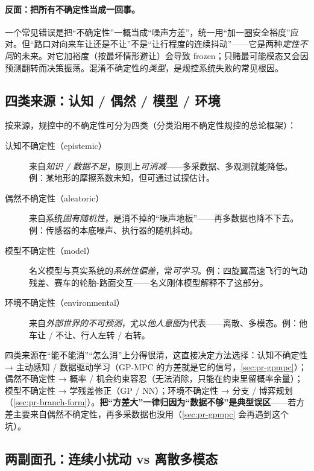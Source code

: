 \paragraph{反面：把所有不确定性当成一回事。}
一个常见错误是把“不确定性”一概当成“噪声方差”，统一用“加一圈安全裕度”应对。但“路口对向来车让还是不让”不是“让行程度的连续抖动”——它是两种\emph{定性不同}的未来。对它加裕度（按最坏情形避让）会导致 frozen；只赌最可能模态又会因预测翻转而决策振荡。混淆不确定性的\emph{类型}，是规控系统失败的常见根因。

\subsection{四类来源：认知 / 偶然 / 模型 / 环境}
\label{sec:pr-unc-types}

按来源，规控中的不确定性可分为四类（分类沿用不确定性规控的总论框架）：

\begin{description}
  \item[认知不确定性（epistemic）] 来自\emph{知识 / 数据不足}，原则上\emph{可消减}——多采数据、多观测就能降低。例：某地形的摩擦系数未知，但可通过试探估计。
  \item[偶然不确定性（aleatoric）] 来自系统\emph{固有随机性}，是消不掉的“噪声地板”——再多数据也降不下去。例：传感器的本底噪声、执行器的随机抖动。
  \item[模型不确定性（model）] 名义模型与真实系统的\emph{系统性偏差}，常\emph{可学习}。例：四旋翼高速飞行的气动残差、赛车的轮胎-路面交互——名义刚体模型解释不了这部分。
  \item[环境不确定性（environmental）] 来自\emph{外部世界的不可预测}，尤以\emph{他人意图}为代表——离散、多模态。例：他车让 / 不让、行人左转 / 右转。
\end{description}

\begin{insight}
四类来源在“能不能消”“怎么消”上分得很清，这直接决定方法选择：认知不确定性 → 主动感知 / 数据驱动学习（GP-MPC 的方差就是它的信号，\cref{sec:pr-gpmpc}）；偶然不确定性 → 概率 / 机会约束容忍（无法消除，只能在约束里留概率余量）；模型不确定性 → 学残差修正（GP / NN）；环境不确定性 → 分支 / 博弈规划（\cref{sec:pr-branch-form}）。\textbf{把“方差大”一律归因为“数据不够”是典型误区}——若方差主要来自偶然不确定性，再多采数据也没用（\cref{sec:pr-gpmpc} 会再遇到这个坑）。
\end{insight}

\subsection{两副面孔：连续小扰动 vs 离散多模态}
\label{sec:pr-unc-faces}

